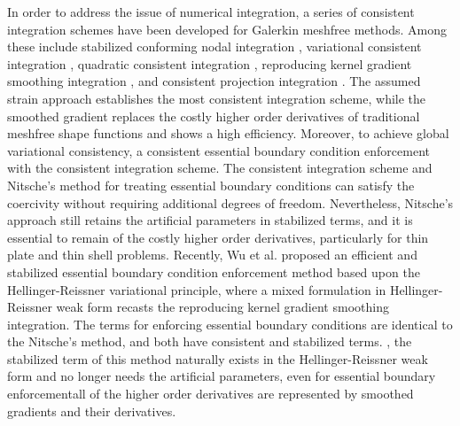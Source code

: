 In order to address the issue of numerical integration, a series of consistent integration schemes have been developed for Galerkin meshfree methods. Among these include stabilized conforming nodal integration \cite{chen2001} , variational consistent integration \cite{chen2013a}, quadratic consistent integration \cite{duan2012a}, reproducing kernel gradient smoothing integration \cite{wang2019a}, and consistent projection integration  \cite{wang2023}. The assumed strain approach establishes the most consistent integration scheme, while the smoothed gradient replaces the costly higher order derivatives of traditional meshfree shape functions and shows a high efficiency. Moreover, to achieve global variational consistency, a consistent essential boundary condition enforcement \DIFdelbegin {}\DIFdelend \DIFaddbegin {}\DIFaddend with the consistent integration scheme. The \DIFaddbegin {}\DIFaddend consistent integration scheme and Nitsche’s method for treating essential boundary conditions \DIFdelbegin {}\DIFdelend \DIFaddbegin {}\DIFaddend can satisfy the coercivity without requiring additional degrees of freedom. Nevertheless, Nitsche's approach still retains the artificial parameters in \DIFaddbegin {}\DIFaddend stabilized terms, and it is essential to remain \DIFdelbegin {}\DIFdelend \DIFaddbegin {}\DIFaddend of the costly higher order derivatives, particularly for thin plate and thin shell problems. Recently, Wu et al. \cite{wu2022a,wu2023}  proposed an efficient and stabilized essential boundary condition enforcement method based upon the Hellinger-Reissner variational principle, where a mixed formulation in Hellinger-Reissner weak form recasts the reproducing kernel gradient smoothing integration. The terms \DIFaddbegin {}\DIFaddend for enforcing essential boundary conditions are identical to the Nitsche’s method, and both have consistent and stabilized terms. \DIFdelbegin {}\DIFdelend \DIFaddbegin {}\DIFaddend , the stabilized term of this method naturally exists in the Hellinger-Reissner weak form and no longer needs the artificial parameters, even for essential boundary enforcement\DIFdelbegin {}\DIFdelend \DIFaddbegin {}\DIFaddend all of the higher order derivatives are represented by \DIFaddbegin {}\DIFaddend smoothed gradients and their derivatives.

